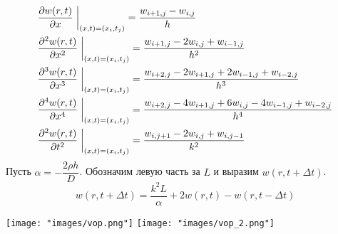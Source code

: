 \begin{align}
  &\dfrac{\partial w(r,t)}{\partial x}\;\bigg|_{(x,t)=(x_i,t_j)}=\dfrac{w_{i+1,j}-w_{i,j}}{h}\notag\\
  &\dfrac{\partial^2 w(r,t)}{\partial x^2}\;\bigg|_{(x,t)=(x_i,t_j)}=\dfrac{w_{i+1,j}-2w_{i,j}+w_{i-1,j}}{h^2}\notag\\
  &\dfrac{\partial^3 w(r,t)}{\partial x^3}\;\bigg|_{(x,t)=(x_i,t_j)}=\dfrac{w_{i+2,j}-2w_{i+1,j}+2w_{i-1,j}+w_{i-2,j}}{h^3}\\
  &\dfrac{\partial^4 w(r,t)}{\partial x^4}\;\bigg|_{(x,t)=(x_i,t_j)}=\dfrac{w_{i+2,j}-4w_{i+1,j}+6w_{i,j}-4w_{i-1,j}+w_{i-2,j}}{h^4}\notag\\
  &\dfrac{\partial^2 w(r,t)}{\partial t^2}\;\bigg|_{(x,t)=(x_i,t_j)}=\dfrac{w_{i,j+1}-2w_{i,j}+w_{i,j-1}}{k^2}\notag
\end{align}
Пусть $\alpha=-\dfrac{2\rho h}{D}$. Обозначим левую часть за $L$ и выразим $w(r,t+\Delta t)$.
\begin{equation}
  w(r,t+\Delta t)=\dfrac{k^2L}{\alpha}+2w(r,t)-w(r,t-\Delta t)
\end{equation}
\begin{center}
  \texttt{[image: "images/vop.png"]}
  \texttt{[image: "images/vop\_2.png"]}
\end{center}
% 
